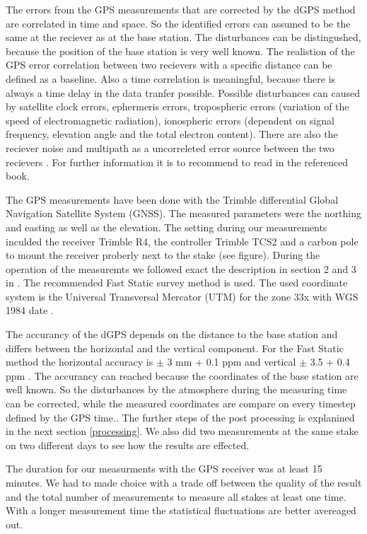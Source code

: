 The errors from the GPS measurements that are corrected by the dGPS method are correlated in time and space.
So the identified errors can assumed to be the same at the reciever as at the base station.
The disturbances can be distingushed, because the position of the base station is very well known.
The realistion of the GPS error correlation between two recievers with a specific distance can be defined as a baseline.
Also a time correlation is meaningful, because there is always a time delay in the data tranfer possible.
Possible disturbances can caused by satellite clock errors, ephermeris errors, tropospheric errors (variation of the speed of electromagnetic radiation), ionospheric errors (dependent on signal frequency, elevation angle and the total electron content). 
There are also the reciever noise and multipath as a uncorreleted error source between the two recievers \citep{UGPS}.
For further information it is to recommend to read in the referenced book.
\medskip

The GPS measurements have been done with the Trimble differential Global Navigation Satellite System (GNSS). 
The measured parameters were the northing and easting as well as the elevation.
The setting during our measurements inculded the receiver Trimble R4, the controller Trimble TCS2 and a carbon pole to mount the receiver proberly next to the stake (see figure).
During the operation of the measuremts we followed exact the description in section 2 and 3 in \cite{Trquickstart}. 
The recommended Fast Static survey method is used.
The used coordinate system is the Universal Transversal Mercator (UTM) for the zone 33x with WGS 1984 date \citep{Trquickstart}. 
\medskip

The accurancy of the dGPS depends on the distance to the base station and differs between the horizontal and the vertical component.
For the Fast Static method the horizontal accuracy is $ \pm $ 3 mm + 0.1 ppm and vertical $ \pm $ 3.5 + 0.4 ppm  \citep{Trquickstart}.
The accurancy can reached because the coordinates of the base station are well known. 
So the disturbances by the atmosphere during the measuring time can be corrected, while the measured coordinates are compare on every timestep defined by the GPS time.. 
The further steps of the post processing is explanined in the next section \ref{processing}.
We also did two measurements at the same stake on two different days to see how the results are effected.
\medskip

The duration for our measurments with the GPS receiver was at least 15 minutes. 
We had to made choice with a trade off between the quality of the result and the total number of measurements to measure all stakes at least one time. 
With a longer measurement time the statistical fluctuations are better avereaged out.
\medskip

